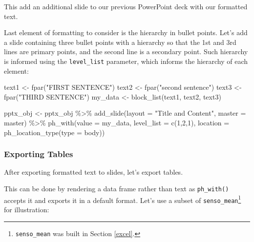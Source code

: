 \documentclass[
]{krantz}
\makeatletter
\newenvironment{Shaded}{\begin{snugshade}}{\end{snugshade}}
\newcommand{\AttributeTok}[1]{\textcolor[rgb]{0.61,0.61,0.61}{#1}}
\newcommand{\DecValTok}[1]{\textcolor[rgb]{0.06,0.06,0.06}{#1}}
\newcommand{\FunctionTok}[1]{\textcolor[rgb]{0,0,0}{#1}}
\newcommand{\NormalTok}[1]{#1}
\newcommand{\OtherTok}[1]{\textcolor[rgb]{0.37,0.37,0.37}{#1}}
\newcommand{\SpecialCharTok}[1]{\textcolor[rgb]{0,0,0}{#1}}
\newcommand{\StringTok}[1]{\textcolor[rgb]{0.5,0.5,0.5}{#1}}
\newenvironment{kframe}{%
\medskip{}
\setlength{\fboxsep}{.8em}
 \def\at@end@of@kframe{}%
 \ifinner\ifhmode%
  \def\at@end@of@kframe{\end{minipage}}%
  \begin{minipage}{\columnwidth}%
 \fi\fi%
 \def\FrameCommand##1{\hskip\@totalleftmargin \hskip-\fboxsep
 \colorbox{shadecolor}{##1}\hskip-\fboxsep
     \hskip-\linewidth \hskip-\@totalleftmargin \hskip\columnwidth}%
 \MakeFramed {\advance\hsize-\width
   \@totalleftmargin\z@ \linewidth\hsize
   \@setminipage}}%
 {\par\unskip\endMakeFramed%
 \at@end@of@kframe}
\renewenvironment{Shaded}{\begin{kframe}}{\end{kframe}}
\makeatother
\begin{document}
This add an additional slide to our previous PowerPoint deck with our formatted text.

Last element of formatting to consider is the hierarchy in bullet points. Let's add a slide containing three bullet points with a hierarchy so that the 1st and 3rd lines are primary points, and the second line is a secondary point. Such hierarchy is informed using the \texttt{level\_list} parameter, which informs the hierarchy of each element:

\begin{Shaded}
\begin{Highlighting}[]
\NormalTok{text1 }\OtherTok{\textless{}{-}} \FunctionTok{fpar}\NormalTok{(}\StringTok{"FIRST SENTENCE"}\NormalTok{)}
\NormalTok{text2 }\OtherTok{\textless{}{-}} \FunctionTok{fpar}\NormalTok{(}\StringTok{"second sentence"}\NormalTok{)}
\NormalTok{text3 }\OtherTok{\textless{}{-}} \FunctionTok{fpar}\NormalTok{(}\StringTok{"THIRD SENTENCE"}\NormalTok{)}
\NormalTok{my\_data }\OtherTok{\textless{}{-}} \FunctionTok{block\_list}\NormalTok{(text1, text2, text3)}

\NormalTok{pptx\_obj }\OtherTok{\textless{}{-}}\NormalTok{ pptx\_obj }\SpecialCharTok{\%\textgreater{}\%}
  \FunctionTok{add\_slide}\NormalTok{(}\AttributeTok{layout =} \StringTok{"Title and Content"}\NormalTok{, }\AttributeTok{master =}\NormalTok{ master) }\SpecialCharTok{\%\textgreater{}\%} 
  \FunctionTok{ph\_with}\NormalTok{(}\AttributeTok{value =}\NormalTok{ my\_data, }\AttributeTok{level\_list =} \FunctionTok{c}\NormalTok{(}\DecValTok{1}\NormalTok{,}\DecValTok{2}\NormalTok{,}\DecValTok{1}\NormalTok{), }
          \AttributeTok{location =} \FunctionTok{ph\_location\_type}\NormalTok{(}\AttributeTok{type =} \StringTok{\textquotesingle{}body\textquotesingle{}}\NormalTok{))}
\end{Highlighting}
\end{Shaded}

\hypertarget{exporting-tables}{%
\subsubsection{Exporting Tables}\label{exporting-tables}}

After exporting formatted text to slides, let's export tables.

This can be done by rendering a data frame rather than text as \texttt{ph\_with()} accepts it and exports it in a default format. Let's use a subset of \texttt{senso\_mean}\footnote{\texttt{senso\_mean} was built in Section \ref{excel}.} for illustration:
\end{document}
